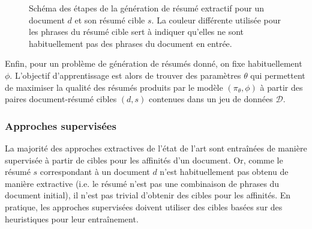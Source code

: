 \begin{figure}[ht!]
\begin{center}
\end{center}
\caption[Processus de génération d'un résumé extractif]{Schéma des étapes de la génération de résumé extractif pour un document $d$ et 
son résumé cible $s$. La couleur différente utilisée pour les phrases du résumé 
cible sert à indiquer qu'elles ne sont habituellement pas des phrases du document
en entrée.}
\label{fig:summ}
\end{figure}

Enfin, pour un problème de génération de résumés donné, on fixe habituellement $\phi$.
L'objectif d'apprentissage est alors de trouver des paramètres $\theta$
qui permettent de maximiser la qualité des résumés produits par le modèle
$(\pi_\theta, \phi)$ à partir des paires document-résumé cibles $(d, s)$ contenues
dans un jeu de données $\mathcal{D}$.

\subsubsection*{Approches supervisées}

La majorité des approches extractives de l'état de l'art sont entraînées 
de manière supervisée à partir de cibles pour les affinités d'un document.
Or, comme le résumé $s$ correspondant à un document $d$ n'est habituellement pas obtenu de
manière extractive (i.e. le résumé n'est pas une combinaison de phrases du document initial),
il n'est pas trivial d'obtenir des cibles pour les affinités.
En pratique, les approches supervisées doivent utiliser des cibles basées sur des heuristiques pour
leur entraînement.

